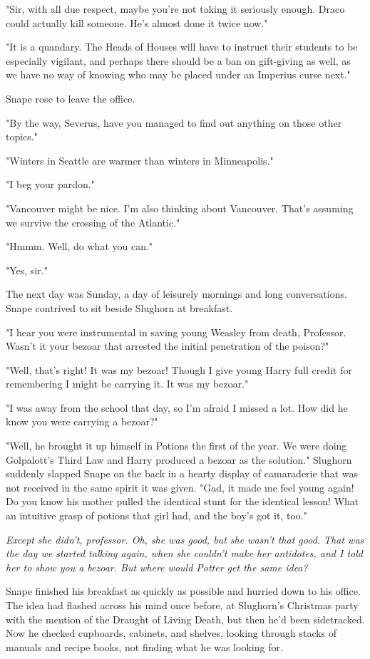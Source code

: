 "Sir, with all due respect, maybe you're not taking it seriously enough. Draco could actually kill someone. He's almost done it twice now."

"It is a quandary. The Heads of Houses will have to instruct their students to be especially vigilant, and perhaps there should be a ban on gift-giving as well, as we have no way of knowing who may be placed under an Imperius curse next."

Snape rose to leave the office.

"By the way, Severus, have you managed to find out anything on those other topics."

"Winters in Seattle are warmer than winters in Minneapolis."

"I beg your pardon."

"Vancouver might be nice. I'm also thinking about Vancouver. That's assuming we survive the crossing of the Atlantic."

"Hmmm. Well, do what you can."

"Yes, sir."

The next day was Sunday, a day of leisurely mornings and long conversations. Snape contrived to sit beside Slughorn at breakfast.

"I hear you were instrumental in saving young Weasley from death, Professor. Wasn't it your bezoar that arrested the initial penetration of the poison?"

"Well, that's right! It was my bezoar! Though I give young Harry full credit for remembering I might be carrying it. It was my bezoar."

"I was away from the school that day, so I'm afraid I missed a lot. How did he know you were carrying a bezoar?"

"Well, he brought it up himself in Potions the first of the year. We were doing Golpalott's Third Law and Harry produced a bezoar as the solution." Slughorn suddenly slapped Snape on the back in a hearty display of camaraderie that was not received in the same spirit it was given. "Gad, it made me feel young again! Do you know his mother pulled the identical stunt for the identical lesson! What an intuitive grasp of potions that girl had, and the boy's got it, too."

\emph{Except she didn't, professor. Oh, she was good, but she wasn't that good. That was the day we started talking again, when she couldn't make her antidotes, and I told her to show you a bezoar. But where would Potter get the same idea?}

Snape finished his breakfast as quickly as possible and hurried down to his office. The idea had flashed across his mind once before, at Slughorn's Christmas party with the mention of the Draught of Living Death, but then he'd been sidetracked. Now he checked cupboards, cabinets, and shelves, looking through stacks of manuals and recipe books, not finding what he was looking for.

